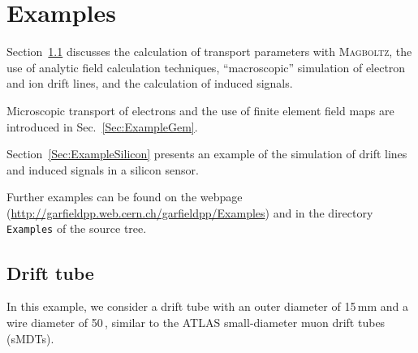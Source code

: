 \section{Examples}

Section~\ref{Sec:ExampleTube} discusses the 
calculation of transport parameters with \textsc{Magboltz}, 
the use of analytic field calculation techniques, 
``macroscopic'' simulation of electron and ion drift lines, 
and the calculation of induced signals. 
 
Microscopic transport of electrons and 
the use of finite element field maps are introduced in 
Sec.~\ref{Sec:ExampleGem}. 

Section~\ref{Sec:ExampleSilicon} presents an example of 
the simulation of drift lines and induced signals in a 
silicon sensor.
 
Further examples can be found on the webpage 
(\url{http://garfieldpp.web.cern.ch/garfieldpp/Examples}) and 
in the directory \texttt{Examples} of the source tree.
 
\subsection{Drift tube}\label{Sec:ExampleTube}
In this example, we consider a drift tube with an outer diameter of 
15\,mm and a wire diameter of 50\,, similar to the 
ATLAS small-diameter muon drift tubes (sMDTs).

